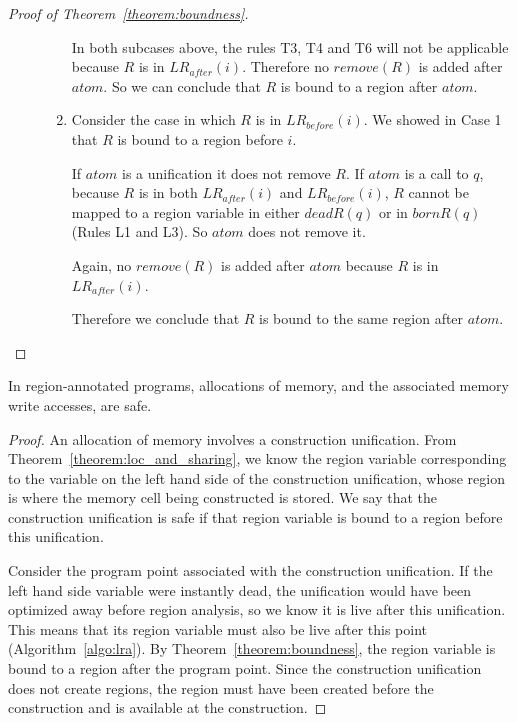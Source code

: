 \documentclass{tlp}
\newcommand{\LRb}[1]{\ensuremath{\mathit{LR}_{before}(#1)}}
\newcommand{\LRa}[1]{\ensuremath{\mathit{LR}_{after}(#1)}}
\newcommand{\bornR}[1]{\ensuremath{{bornR}(#1)}}
\newcommand{\deadR}[1]{\ensuremath{{deadR}(#1)}}
\newcommand{\remove}[1]{\ensuremath{{remove}(#1)}}
\begin{document}
\begin{proof}[Proof of Theorem~\ref{theorem:boundness}]
\begin{description}
\begin{enumerate}
        In both subcases above,
        the rules T3, T4 and T6 will not be applicable
        because $R$ is in \LRa{i}.
        Therefore no \remove{R} is added after ${atom}$.
        So we can conclude that $R$ is bound to a region after ${atom}$.

    \item
        Consider the case in which $R$ is in \LRb{i}.
        We showed in Case 1 that $R$ is bound to a region before $i$.

        If ${atom}$ is a unification it does not remove $R$.
        If ${atom}$ is a call to $q$,
        because $R$ is in both \LRa{i} and \LRb{i},
        $R$ cannot be mapped to a region variable
        in either \deadR{q} or in \bornR{q} (Rules L1 and L3).
        So ${atom}$ does not remove it.

        Again, no \remove{R} is added after ${atom}$ because $R$ is in \LRa{i}.

        Therefore we conclude that
        $R$ is bound to the same region after ${atom}$.
    \end{enumerate}
\end{description}
\end{proof}

\begin{theorem}
In region-annotated programs,
allocations of memory, and the associated memory write accesses, are safe.
\end{theorem}

\begin{proof}
An allocation of memory involves a construction unification.
From Theorem~\ref{theorem:loc_and_sharing},
we know the region variable corresponding to
the variable on the left hand side of the construction unification,
whose region is where the memory cell being constructed is stored.
We say that the construction unification is safe
if that region variable is bound to a region before this unification.

Consider the program point associated with the construction unification.
If the left hand side variable were instantly dead,
the unification would have been optimized away before region analysis,
so we know it is live after this unification.
This means that its region variable
must also be live after this point (Algorithm~\ref{algo:lra}).
By Theorem~\ref{theorem:boundness},
the region variable is bound to a region after the program point.
Since the construction unification does not create regions,
the region must have been created before the construction
and is available at the construction.
\end{proof}
\end{document}
